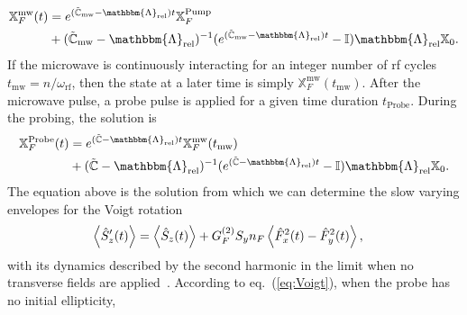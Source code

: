 \documentclass[%
reprint,
 amsmath,amssymb,
 aps,
floatfix,
]{revtex4-1}
\begin{document}
\begin{align}
\mathbb{X}^{\mathrm{mw}}_F(t)&=e^{(\tilde{\mathbb{C}}_{\mathrm{mw}}-\mathbbm{\Lambda}_\mathrm{rel})t}\mathbb{X}^{\mathrm{Pump}}_F\\
&+(\tilde{\mathbb{C}}_{\mathrm{mw}}-\mathbbm{\Lambda}_\mathrm{rel})^{-1}(e^{(\tilde{\mathbb{C}}_{\mathrm{mw}}-\mathbbm{\Lambda}_\mathrm{rel})t}-\mathbb{I})\mathbbm{\Lambda}_\mathrm{rel} \mathbb{X}_{0}.\nonumber
\end{align}
If the microwave is continuously interacting for an integer number of rf cycles $t_{\mathrm{mw}}=n/\omega_{\mathrm{rf}}$, then the state at a later time is simply $\mathbb{X}^{\mathrm{mw}}_F(t_{\mathrm{mw}})$.
After the microwave pulse, a probe pulse is applied for a given time duration $t_{\mathrm{Probe}}$. During the probing, %
the solution is 
\begin{align}
\mathbb{X}^{\mathrm{Probe}}_F(t)&=e^{(\tilde{\mathbb{C}}-\mathbbm{\Lambda}_\mathrm{rel})t}\mathbb{X}^{\mathrm{mw}}_F(t_{\mathrm{mw}})\nonumber\\
&+(\tilde{\mathbb{C}}-\mathbbm{\Lambda}_\mathrm{rel})^{-1}(e^{(\tilde{\mathbb{C}}-\mathbbm{\Lambda}_\mathrm{rel})t}-\mathbb{I})\mathbbm{\Lambda}_\mathrm{rel} \mathbb{X}_{0}.\label{eq:solFloquet}
\end{align}
The equation above is the solution from which we can determine the slow varying envelopes for the Voigt rotation
\begin{align}
\Braket{\hat{S}_z'(t)}&=\Braket{\hat{S}_z(t)}+
G_{F}^{(2)} S_y n_F \Braket{\hat{F}_x^2(t)-\hat{F}_y^2(t)},\label{eq:Voigt}
\end{align}
with its dynamics described by the second harmonic in the limit when no transverse fields are applied~\cite{Tadas19}. According to eq.~(\ref{eq:Voigt}), when the probe has no initial ellipticity, 
\end{document}

